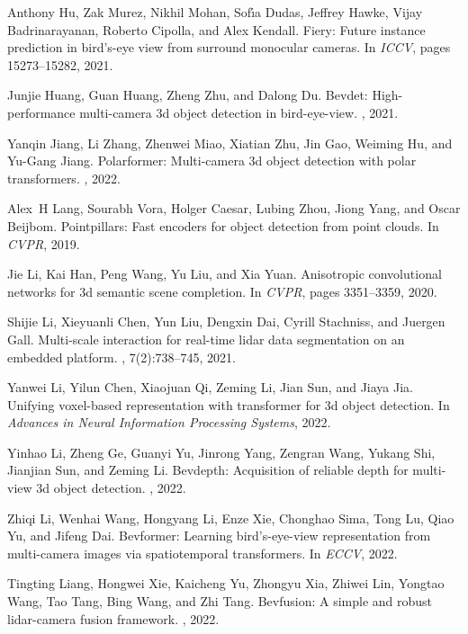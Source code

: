 \documentclass[10pt,twocolumn,letterpaper]{article}
\begin{document}
{\begin{thebibliography}{10}
Anthony Hu, Zak Murez, Nikhil Mohan, Sof{\'\i}a Dudas, Jeffrey Hawke, Vijay
  Badrinarayanan, Roberto Cipolla, and Alex Kendall.
\newblock Fiery: Future instance prediction in bird's-eye view from surround
  monocular cameras.
\newblock In {\em ICCV}, pages 15273--15282, 2021.

Junjie Huang, Guan Huang, Zheng Zhu, and Dalong Du.
\newblock Bevdet: High-performance multi-camera 3d object detection in
  bird-eye-view.
, 2021.

Yanqin Jiang, Li Zhang, Zhenwei Miao, Xiatian Zhu, Jin Gao, Weiming Hu, and
  Yu-Gang Jiang.
\newblock Polarformer: Multi-camera 3d object detection with polar
  transformers.
, 2022.

Alex~H Lang, Sourabh Vora, Holger Caesar, Lubing Zhou, Jiong Yang, and Oscar
  Beijbom.
\newblock Pointpillars: Fast encoders for object detection from point clouds.
\newblock In {\em CVPR}, 2019.

Jie Li, Kai Han, Peng Wang, Yu Liu, and Xia Yuan.
\newblock Anisotropic convolutional networks for 3d semantic scene completion.
\newblock In {\em CVPR}, pages 3351--3359, 2020.

Shijie Li, Xieyuanli Chen, Yun Liu, Dengxin Dai, Cyrill Stachniss, and Juergen
  Gall.
\newblock Multi-scale interaction for real-time lidar data segmentation on an
  embedded platform.
, 7(2):738--745, 2021.

Yanwei Li, Yilun Chen, Xiaojuan Qi, Zeming Li, Jian Sun, and Jiaya Jia.
\newblock Unifying voxel-based representation with transformer for 3d object
  detection.
\newblock In {\em Advances in Neural Information Processing Systems}, 2022.

Yinhao Li, Zheng Ge, Guanyi Yu, Jinrong Yang, Zengran Wang, Yukang Shi,
  Jianjian Sun, and Zeming Li.
\newblock Bevdepth: Acquisition of reliable depth for multi-view 3d object
  detection.
, 2022.

Zhiqi Li, Wenhai Wang, Hongyang Li, Enze Xie, Chonghao Sima, Tong Lu, Qiao Yu,
  and Jifeng Dai.
\newblock Bevformer: Learning bird's-eye-view representation from multi-camera
  images via spatiotemporal transformers.
\newblock In {\em ECCV}, 2022.

Tingting Liang, Hongwei Xie, Kaicheng Yu, Zhongyu Xia, Zhiwei Lin, Yongtao
  Wang, Tao Tang, Bing Wang, and Zhi Tang.
\newblock Bevfusion: A simple and robust lidar-camera fusion framework.
, 2022.


\end{thebibliography}}
\end{document}
